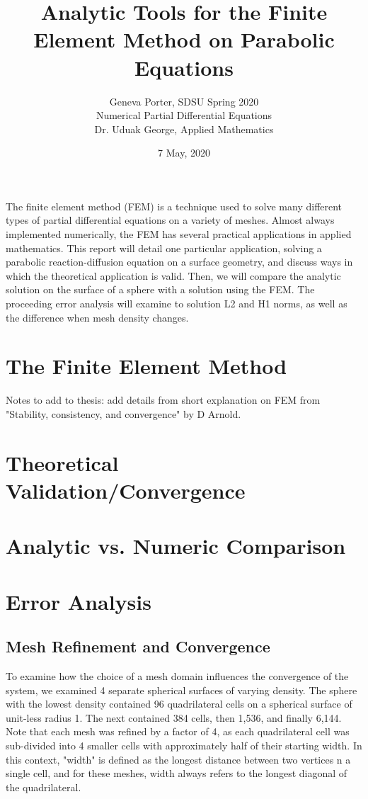 \documentclass[12pt]{article}
\title{Analytic Tools for the Finite Element Method on Parabolic Equations}
\author{Geneva Porter, SDSU Spring 2020\\ 
Numerical Partial Differential Equations\\
Dr. Uduak George, Applied Mathematics}
\date{7 May, 2020}
\begin{document}
\maketitle

The finite element method (FEM) is a technique used to solve many different types of partial differential equations on a variety of meshes. Almost always implemented numerically, the FEM has several practical applications in applied mathematics. This report will detail one particular application, solving a parabolic reaction-diffusion equation on a surface geometry, and discuss ways in which the theoretical application is valid. Then, we will compare the analytic solution on the surface of a sphere with a solution using the FEM. The proceeding error analysis will examine to solution L2 and H1 norms, as well as the difference when mesh density changes.

\section{The Finite Element Method}

Notes to add to thesis: add details from short explanation on FEM from "Stability, consistency, and convergence" by D Arnold.

\section{Theoretical Validation/Convergence}

\section{Analytic vs. Numeric Comparison}

\pagebreak


\section{Error Analysis}

\subsection{Mesh Refinement and Convergence}

To examine how the choice of a mesh domain influences the convergence of the system, we examined 4 separate spherical surfaces of varying density. The sphere with the lowest density contained 96 quadrilateral cells on a spherical surface of unit-less radius 1. The next contained 384 cells, then 1,536, and finally 6,144. Note that each mesh was refined by a factor of 4, as each quadrilateral cell was sub-divided into 4 smaller cells with approximately half of their starting width. In this context, "width" is defined as the longest distance between two vertices n a single cell, and for these meshes, width always refers to the longest diagonal of the quadrilateral. 
\end{document}
